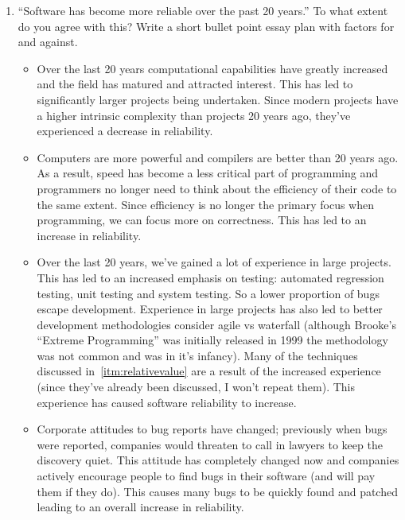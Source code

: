 \documentclass[10pt,\jkfside,a4paper]{article}
\begin{document}
\begin{enumerate}
\begin{examquestion}{2000}{9}{6}
\begin{enumerate}[label=(\alph*)]
\end{enumerate}

\end{examquestion}

\item ``Software has become more reliable over the past 20 years.'' To
what extent do you agree with this? Write a short bullet point essay plan
with factors for and against.

\begin{itemize}

\item Over the last 20 years computational capabilities have greatly increased
and the field has matured and attracted interest. This has led to significantly
larger projects being undertaken. Since modern projects have a higher intrinsic
complexity than projects 20 years ago, they've experienced a decrease in
reliability.

\item Computers are more powerful and compilers are better than 20 years ago.
As a result, speed has become a less critical part of programming and
programmers no longer need to think about the efficiency of their code to the
same extent. Since efficiency is no longer the primary focus when programming,
we can focus more on correctness. This has led to an increase in reliability.

\item Over the last 20 years, we've gained a lot of experience in large
projects. This has led to an increased emphasis on testing: automated
regression testing, unit testing and system testing. So a lower proportion
of  bugs escape development. Experience in large projects has also
led to better development methodologies consider agile vs waterfall (although
Brooke's ``Extreme Programming'' was initially released in 1999 the methodology
was not common and was in it's infancy). Many of the techniques discussed
in~\ref{itm:relativevalue} are a result of the increased experience (since
they've already been discussed, I won't repeat them).
This experience has caused software reliability to increase.

\item Corporate attitudes to bug reports have changed; previously when bugs
were reported, companies would threaten to call in lawyers to keep the
discovery quiet. This attitude has completely changed now and companies
actively encourage people to find bugs in their software (and will pay
them if they do). This causes many bugs to be quickly found and patched
leading to an overall increase in reliability.


\end{itemize}
\end{enumerate}
\end{document}
